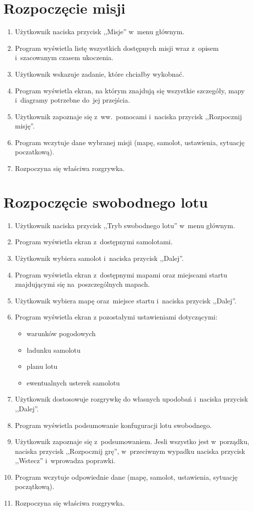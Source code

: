 \documentclass{mwrep}
\begin{document}
\section{Rozpoczęcie misji}
\begin{enumerate}
  \item Użytkownik naciska przycisk ,,Misje'' w~menu głównym.
  \item Program wyświetla listę wszystkich dostępnych misji wraz z~opisem i~szacowanym czasem ukoczenia.
  \item Użytkownik wskazuje zadanie, które chciałby wykobnać.
  \item Program wyświetla ekran, na którym znajdują się wszystkie szczegóły, mapy i~diagramy potrzebne do~jej przejścia.
  \item Użytkownik zapoznaje się z~ww.~pomocami i~naciska przycisk ,,Rozpocznij misję''.
  \item Program wczytuje dane wybranej misji (mapę, samolot, ustawienia, sytuację poczatkową).
  \item Rozpoczyna się właściwa rozgrywka.
\end{enumerate}

\section{Rozpoczęcie swobodnego lotu}
\begin{enumerate}
  \item Użytkownik naciska przycisk ,,Tryb swobodnego lotu'' w~menu głównym.
  \item Program wyświetla ekran z~dostępnymi samolotami.
  \item Użytkownik wybiera samolot i~naciska przycisk ,,Dalej''.
  \item Program wyświetla ekran z~dostępnymi mapami oraz miejscami startu znajdującymi się na~poszczególnych mapach.
  \item Użytkownik wybiera mapę oraz~miejsce startu i~naciska przycisk ,,Dalej''.
  \item Program wyświetla ekran z pozostałymi ustawieniami dotyczącymi:
  \begin{itemize}
    \item warunków pogodowych
    \item ładunku samolotu
    \item planu lotu
    \item ewentualnych usterek samolotu
  \end{itemize}
  \item Użytkownik dostosowuje rozgrywkę do własnych upodobań i~naciska przycisk ,,Dalej''.
  \item Program wyświetla podsumowanie konfuguracji lotu swobodnego.
  \item Użytkownik zapoznaje się z~podsumowaniem. Jesli wszystko jest w~porządku, naciska przycisk ,,Rozpocznij grę'', w~przeciwnym wypadku naciska przycisk ,,Wstecz'' i~wprowadza poprawki.
  \item Program wczytuje odpowiednie dane (mapę, samolot, ustawienia, sytuację początkową).
  \item Rozpoczyna się właściwa rozgrywka.
\end{enumerate}
\end{document}

